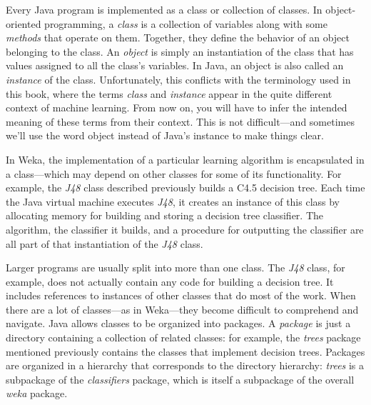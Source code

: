 Every Java program is implemented as a class or collection of
classes. In object-oriented programming, a \textit{class} is a
collection of variables along with some \textit{methods} that operate
on them. Together, they define the behavior of an object belonging to
the class. An \textit{object} is simply an instantiation of the class
that has values assigned to all the class’s variables. In Java, an
object is also called an \textit{instance} of the
class. Unfortunately, this conflicts with the terminology used in this
book, where the terms \textit{class} and \textit{instance} appear in
the quite different context of machine learning. From now on, you will
have to infer the intended meaning of these terms from their
context. This is not difficult---and sometimes we'll use the word object
instead of Java's instance to make things clear.

In Weka, the implementation of a particular learning algorithm is
encapsulated in a class---which may depend on other classes for some
of its functionality. For example, the \textit{J48} class described
previously builds a C4.5 decision tree. Each time the Java virtual
machine executes \textit{J48}, it creates an instance of this class by
allocating memory for building and storing a decision tree
classifier. The algorithm, the classifier it builds, and a procedure
for outputting the classifier are all part of that instantiation of
the \textit{J48} class.

Larger programs are usually split into more than one class. The
\textit{J48} class, for example, does not actually contain any code
for building a decision tree. It includes references to instances of
other classes that do most of the work. When there are a lot of
classes---as in Weka---they become difficult to comprehend and
navigate. Java allows classes to be organized into packages. A
\textit{package} is just a directory containing a collection of
related classes: for example, the \textit{trees} package mentioned
previously contains the classes that implement decision
trees. Packages are organized in a hierarchy that corresponds to the
directory hierarchy: \textit{trees} is a subpackage of the
\textit{classifiers} package, which is itself a subpackage of the
overall \textit{weka} package.

